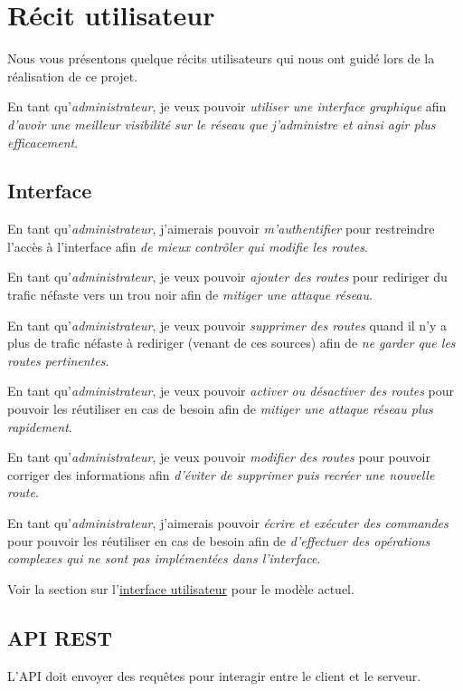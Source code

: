 \chapter{Récit utilisateur}
Nous vous présentons quelque récits utilisateurs qui nous ont guidé lors de la réalisation de ce projet.

 En tant qu'\textit{administrateur}, je veux pouvoir \textit{utiliser une interface graphique} afin \textit{d'avoir une meilleur visibilité sur le réseau que j'administre et ainsi agir plus efficacement}.

\section{Interface}

En tant qu'\textit{administrateur}, j'aimerais pouvoir \textit{m'authentifier} pour restreindre l'accès à l'interface afin \textit{de mieux contrôler qui modifie les routes}.\bigskip

En tant qu'\textit{administrateur}, je veux pouvoir \textit{ajouter des routes} pour rediriger du trafic néfaste vers un trou noir afin de \textit{mitiger une attaque réseau}.\bigskip

En tant qu'\textit{administrateur}, je veux pouvoir \textit{supprimer des routes} quand il n'y a plus de trafic néfaste à rediriger (venant de ces sources) afin de \textit{ne garder que les routes pertinentes}.\bigskip

En tant qu'\textit{administrateur}, je veux pouvoir \textit{activer ou désactiver des routes} pour pouvoir les réutiliser en cas de besoin afin de \textit{mitiger une attaque réseau plus rapidement}.\bigskip

En tant qu'\textit{administrateur}, je veux pouvoir \textit{modifier des routes} pour pouvoir corriger des informations afin \textit{d'éviter de supprimer puis recréer une nouvelle route}.\bigskip

 En tant qu'\textit{administrateur}, j'aimerais pouvoir \textit{écrire et exécuter des commandes} pour pouvoir les réutiliser en cas de besoin afin de \textit{d'effectuer des opérations complexes qui ne sont pas implémentées dans l'interface}.\bigskip

Voir la section sur l'\hyperref[sssec:ui]{interface utilisateur} pour le modèle actuel.
 \newpage

\section{API REST}
L'API doit envoyer des requêtes pour interagir entre le client et le serveur.\bigskip

